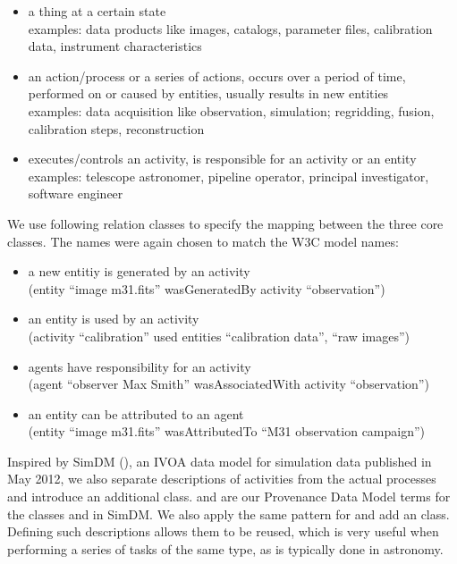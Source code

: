 \begin{itemize}
\item {} a thing at a certain state\\
    examples: data products like images, catalogs, parameter files, calibration data, instrument characteristics

\item {} an action/process or a series of actions, occurs over a period of time, performed on or caused by entities, usually results in new entities\\
    examples: data acquisition like observation, simulation; regridding, fusion, calibration steps, reconstruction

\item {} executes/controls an activity, is responsible for an activity or an entity\\
    examples: telescope astronomer, pipeline operator, principal investigator, software engineer

\end{itemize}

\noindent

We use following relation classes to specify the mapping between the three core 
classes. The names were again chosen to match the W3C model names:
\begin{itemize}
\item {} a new entitiy is generated by an activity\\
        (entity ``image m31.fits'' wasGeneratedBy activity ``observation'')
\item {} an entity is used by an activity\\
        (activity ``calibration'' used entities ``calibration data'', ``raw images'')
\item {} agents have responsibility for an activity\\
        (agent ``observer Max Smith'' wasAssociatedWith activity ``observation'')
\item {} an entity can be attributed to an agent\\
		(entity ``image m31.fits'' wasAttributedTo ``M31 observation campaign'')
\end{itemize}

Inspired by SimDM (\cite{std:SimDM}), an IVOA  data model for simulation data 
published in May 2012, we also separate descriptions of activities from the 
actual processes and introduce an additional  class.
 and  are our Provenance Data Model 
terms for the classes  and  in SimDM. 
We also apply the same pattern for  and add an 
class.
Defining such descriptions allows them to be reused, which is very useful 
when performing a series of tasks of the same type, as is typically done in 
astronomy. 


